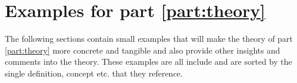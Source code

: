 \chapter{Examples for part \ref{part:theory}} \label{chap:theory_examples}
The following sections contain small examples that will make the theory of part \ref{part:theory} more concrete and tangible and also provide other insights and comments into the theory. These examples are all include and are sorted by the single definition, concept etc. that they reference.

\vfill \minitoc \newpage







